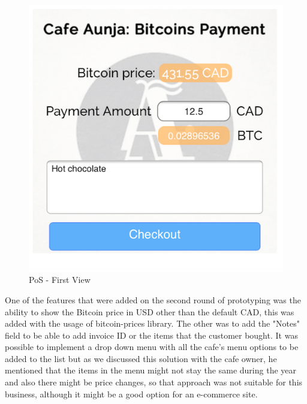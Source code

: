 \begin{figure}[htb]
\centering
\includegraphics[scale=0.5]{fig/First_View.png}
  \caption{PoS - First View}
\label{fig:First_View}
\end{figure}

One of the features that were added on the second round of prototyping was the ability to show the Bitcoin price in USD other than the default CAD, this was added with the usage of bitcoin-prices library. The other was to add the "Notes" field to be able to add invoice ID or the items that the customer bought. It was possible to implement a drop down menu with all the cafe's menu options to be added to the list but as we discussed this solution with the cafe owner, he mentioned that the items in the menu might not stay the same during the year and also there might be price changes, so that approach was not suitable for this business, although it might be a good option for an e-commerce site.

